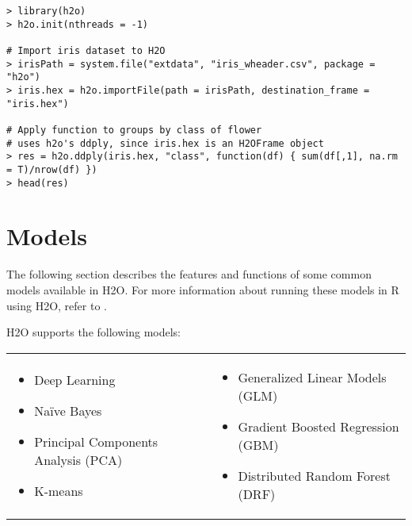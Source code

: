 {\begin{lstlisting}[style=R]
> library(h2o)
> h2o.init(nthreads = -1)

# Import iris dataset to H2O
> irisPath = system.file("extdata", "iris_wheader.csv", package = "h2o")
> iris.hex = h2o.importFile(path = irisPath, destination_frame = "iris.hex")

# Apply function to groups by class of flower
# uses h2o's ddply, since iris.hex is an H2OFrame object
> res = h2o.ddply(iris.hex, "class", function(df) { sum(df[,1], na.rm = T)/nrow(df) })
> head(res)
\end{lstlisting}

\section{Models}

The following section describes the features and functions of some common models available in H2O.  For more information about running these models in R using H2O, refer to . 

H2O supports the following models:  


\begin{frame}%

\begin{tabular}{p{5.5cm}p{5.5cm}}

\begin{itemize}
 \item Deep Learning
  \item Na\"{i}ve Bayes
  \item Principal Components Analysis (PCA)
  \item K-means
\end{itemize} &

\begin{itemize}
     \item Generalized Linear Models (GLM) 
     \item Gradient Boosted Regression (GBM)
  \item Distributed Random Forest (DRF)
\end{itemize}


\end{tabular}
\end{frame}}
